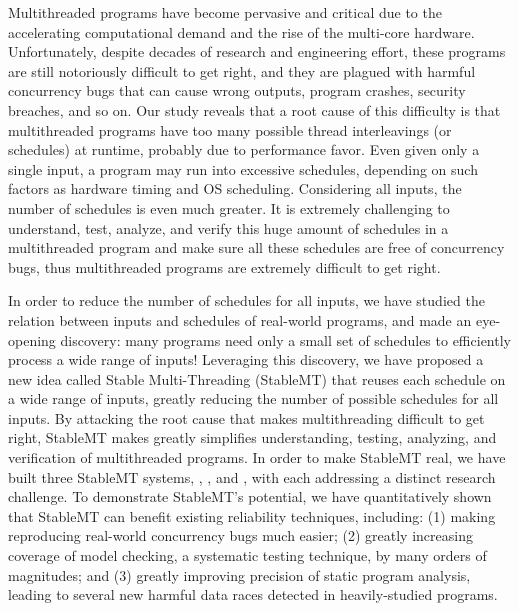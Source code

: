 Multithreaded programs have become pervasive and critical due to the
accelerating computational demand and the rise of the multi-core hardware.
Unfortunately, despite decades of research and engineering effort, these
programs are still notoriously difficult to get right, and they are plagued with
harmful concurrency bugs that can cause wrong outputs, program crashes, security
breaches, and so on. Our study reveals that a root cause of this difficulty is
that multithreaded programs have too many possible thread interleavings (or
schedules) at runtime, probably due to performance favor. Even given only a
single input, a program may run into excessive schedules, depending on such
factors as hardware timing and OS scheduling. Considering all inputs, the number
of schedules is even much greater. It is extremely challenging to understand,
test, analyze, and verify this huge amount of schedules in a multithreaded
program and make sure all these schedules are free of concurrency bugs, thus
multithreaded programs are extremely difficult to get right.

In order to reduce the number of schedules for all inputs, we have studied the
relation between inputs and schedules of real-world programs, and made an
eye-opening discovery: many programs need only a small set of schedules to
efficiently process a wide range of inputs! Leveraging this discovery, we have
proposed a new idea called Stable Multi-Threading (StableMT) that reuses each
schedule on a wide range of inputs, greatly reducing the number of possible
schedules for all inputs. By attacking the root cause that makes multithreading
difficult to get right, StableMT makes greatly simplifies understanding,
testing, analyzing, and verification of multithreaded programs. In order to make
StableMT real, we have built three StableMT systems, \tern, \peregrine, and
\parrot, with each addressing a distinct research challenge. To demonstrate
StableMT's potential, we have quantitatively shown that StableMT can benefit
existing reliability techniques, including: (1) making reproducing real-world
concurrency bugs much easier; (2) greatly increasing coverage of model checking,
a systematic testing technique, by many orders of magnitudes; and (3) greatly
improving precision of static program analysis, leading to several new harmful
data races detected in heavily-studied programs.

